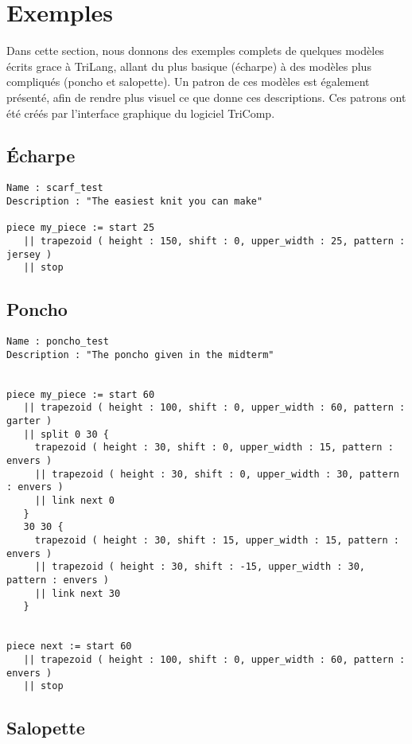 \documentclass[a4paper,10pt]{article}
\begin{document}
\section{Exemples}

Dans cette section, nous donnons des exemples complets de quelques modèles écrits grace à TriLang, allant du plus basique (écharpe) à des modèles plus compliqués (poncho et salopette). Un patron de ces modèles est également présenté, afin de rendre plus visuel ce que donne ces descriptions. Ces patrons ont été créés par l'interface graphique du logiciel TriComp.

\subsection{Écharpe}



\begin{lstlisting}
Name : scarf_test
Description : "The easiest knit you can make"

piece my_piece := start 25
   || trapezoid ( height : 150, shift : 0, upper_width : 25, pattern : jersey )
   || stop
\end{lstlisting}


\subsection{Poncho}

\begin{lstlisting}
Name : poncho_test
Description : "The poncho given in the midterm"


piece my_piece := start 60
   || trapezoid ( height : 100, shift : 0, upper_width : 60, pattern : garter )
   || split 0 30 { 
     trapezoid ( height : 30, shift : 0, upper_width : 15, pattern : envers )
     || trapezoid ( height : 30, shift : 0, upper_width : 30, pattern : envers )
     || link next 0
   }
   30 30 { 
     trapezoid ( height : 30, shift : 15, upper_width : 15, pattern : envers )
     || trapezoid ( height : 30, shift : -15, upper_width : 30, pattern : envers )
     || link next 30
   }


piece next := start 60
   || trapezoid ( height : 100, shift : 0, upper_width : 60, pattern : envers )
   || stop
\end{lstlisting}

\subsection{Salopette}
\end{document}
